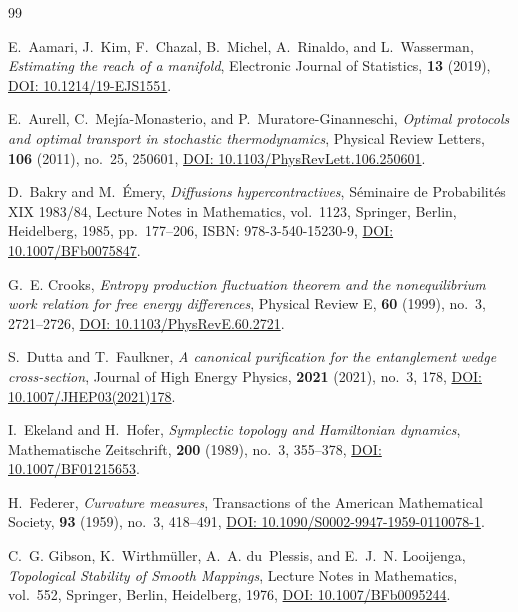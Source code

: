 \documentclass[11pt,a4paper,reqno]{amsart}
\theoremstyle{definition}
\theoremstyle{remark}
\numberwithin{equation}{section}
\begin{document}
\begin{thebibliography}{99}

E.~Aamari, J.~Kim, F.~Chazal, B.~Michel, A.~Rinaldo, and L.~Wasserman,
\emph{Estimating the reach of a manifold},
Electronic Journal of Statistics, \textbf{13} (2019),
\href{https://doi.org/10.1214/19-EJS1551}{DOI: 10.1214/19-EJS1551}.

E.~Aurell, C.~Mej\'ia-Monasterio, and P.~Muratore-Ginanneschi,
\emph{Optimal protocols and optimal transport in stochastic thermodynamics},
Physical Review Letters, \textbf{106} (2011), no.~25, 250601,
\href{https://doi.org/10.1103/PhysRevLett.106.250601}{DOI: 10.1103/PhysRevLett.106.250601}.

D.~Bakry and M.~\'Emery,
\emph{Diffusions hypercontractives},
S\'eminaire de Probabilit\'es XIX 1983/84, Lecture Notes in Mathematics, vol.~1123, Springer, Berlin, Heidelberg, 1985, pp.~177--206,
ISBN: 978-3-540-15230-9,
\href{https://doi.org/10.1007/BFb0075847}{DOI: 10.1007/BFb0075847}.

G.~E. Crooks,
\emph{Entropy production fluctuation theorem and the nonequilibrium work relation for free energy differences},
Physical Review E, \textbf{60} (1999), no.~3, 2721--2726,
\href{https://doi.org/10.1103/PhysRevE.60.2721}{DOI: 10.1103/PhysRevE.60.2721}.

S.~Dutta and T.~Faulkner,
\emph{A canonical purification for the entanglement wedge cross-section},
Journal of High Energy Physics, \textbf{2021} (2021), no.~3, 178,
\href{https://doi.org/10.1007/JHEP03(2021)178}{DOI: 10.1007/JHEP03(2021)178}.

I.~Ekeland and H.~Hofer,
\emph{Symplectic topology and Hamiltonian dynamics},
Mathematische Zeitschrift, \textbf{200} (1989), no.~3, 355--378,
\href{https://doi.org/10.1007/BF01215653}{DOI: 10.1007/BF01215653}.

H.~Federer,
\emph{Curvature measures},
Transactions of the American Mathematical Society, \textbf{93} (1959), no.~3, 418--491,
\href{https://doi.org/10.1090/S0002-9947-1959-0110078-1}{DOI: 10.1090/S0002-9947-1959-0110078-1}.

C.~G. Gibson, K.~Wirthm\"uller, A.~A. du~Plessis, and E.~J.~N. Looijenga,
\emph{Topological Stability of Smooth Mappings},
Lecture Notes in Mathematics, vol.~552, Springer, Berlin, Heidelberg, 1976,
\href{https://doi.org/10.1007/BFb0095244}{DOI: 10.1007/BFb0095244}.


\end{thebibliography}
\end{document}
